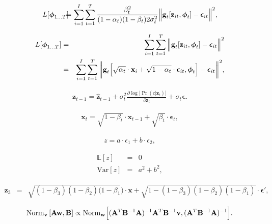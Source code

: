 \documentclass[letterpaper,twoside,openany, titlepage,oldfontcommands,titles,dvipsnames]{memoir}
\begin{document}
\begin{eqnarray}
 L[\boldsymbol\phi_{1\ldots T}] \!\!&\!\!=\!\!&\!\! \sum_{i=1}^{I}\sum_{t=1}^{T}\frac{\beta_t^2}{(1-\alpha_{t})(1-\beta_{t})2\sigma_{t}^{2}}\Big\lVert\mbox{\bf g}_{t}[\mathbf{z}_{it},\boldsymbol\phi_{t}]-\boldsymbol\epsilon_{it}\Big\rVert^2,
 \end{eqnarray}

\begin{eqnarray}\label{eq:diffusion_loss_function_3b}
 L[\boldsymbol\phi_{1\ldots T}] &=& \sum_{i=1}^{I}\sum_{t=1}^{T}\Big\lVert\mbox{\bf g}_{t}[\mathbf{z}_{it},\boldsymbol\phi_{t}]-\boldsymbol\epsilon_{it}\Big\rVert^2\\
 &=& \sum_{i=1}^{I}\sum_{t=1}^{T}\bigg\lVert\mbox{\bf g}_{t}\Bigl[\sqrt{\alpha_t}\cdot\mathbf{x}_i+\sqrt{1-\alpha_t}\cdot\boldsymbol\epsilon_{it},\boldsymbol\phi_{t}\Bigr]-\boldsymbol\epsilon_{it}\bigg\rVert^2\nonumber,
 \end{eqnarray}

\begin{eqnarray}
 \mathbf{z}_{t-1} = \hat{\mathbf{z}}_{t-1} + \sigma_{t}^2\frac{\partial \log\bigl[\Pr(c|\mathbf{z}_{t})\bigr]}{\partial \mathbf{z}_{t}} + \sigma_{t}\boldsymbol\epsilon.
 \end{eqnarray}

\begin{eqnarray}
  \mathbf{x}_{t} = \sqrt{1-\beta_{t}}\cdot\mathbf{x}_{t-1} + \sqrt{\beta_{t}}\cdot\boldsymbol\epsilon_{t},
 \end{eqnarray}



\begin{eqnarray}
 z = a\cdot \epsilon_{1}+b\cdot\epsilon_{2},
 \end{eqnarray}

\begin{eqnarray}
 \mathbb{E}[z] &=& 0\nonumber \\
 \mbox{Var}[z] &=& a^2+b^2,
 \end{eqnarray}

\begin{eqnarray}
 \mathbf{z}_{3} &=&\sqrt{(1-\beta_{3})(1-\beta_{2})(1-\beta_{1}})\cdot\mathbf{x} + \sqrt{1-(1-\beta_{3})(1-\beta_{2})(1-\beta_{1})}\cdot\boldsymbol\epsilon',
 \end{eqnarray}

\begin{eqnarray}
 \mbox{Norm}_{\mathbf{v}}\left[\mathbf{A}\mathbf{w},\mathbf{B}\right] \propto \mbox{Norm}_{\mathbf{w}}\Bigl[(\mathbf{A}^T\mathbf{B}^{-1}\mathbf{A})^{-1}\mathbf{A}^T\mathbf{B}^{-1}\mathbf{v},(\mathbf{A}^T\mathbf{B}^{-1}\mathbf{A})^{-1}\Bigr].
 \end{eqnarray}
\end{document}
